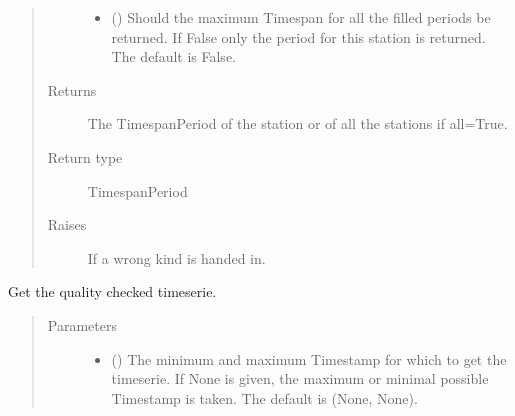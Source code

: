 \documentclass[letterpaper,10pt,english]{sphinxmanual}
\begin{document}
\begin{fulllineitems}
\begin{fulllineitems}
\begin{quote}
\begin{description}
\begin{itemize}
\item {} 
\sphinxAtStartPar
{} (\sphinxstyleliteralemphasis{\sphinxupquote{, }}) \textendash{} Should the maximum Timespan for all the filled periods be returned.
If False only the period for this station is returned.
The default is False.

\end{itemize}

\item[{Returns}] \leavevmode
\sphinxAtStartPar
The TimespanPeriod of the station or of all the stations if all=True.

\item[{Return type}] \leavevmode
\sphinxAtStartPar
TimespanPeriod

\item[{Raises}] \leavevmode
\sphinxAtStartPar
{} \textendash{} If a wrong kind is handed in.

\end{description}\end{quote}

\end{fulllineitems}


\begin{fulllineitems}
\label{\detokenize{weatherDB:weatherDB.station.StationBase.get_qc}}
\sphinxAtStartPar
Get the quality checked timeserie.
\begin{quote}\begin{description}
\item[{Parameters}] \leavevmode\begin{itemize}
\item {} 
\sphinxAtStartPar
{} ({\hyperref[\detokenize{weatherDB.lib:weatherDB.lib.utils.TimestampPeriod}]{}}\sphinxstyleliteralemphasis{\sphinxupquote{(}}\sphinxstyleliteralemphasis{\sphinxupquote{)}}\sphinxstyleliteralemphasis{\sphinxupquote{, }}) \textendash{} The minimum and maximum Timestamp for which to get the timeserie.
If None is given, the maximum or minimal possible Timestamp is taken.
The default is (None, None).


\end{itemize}
\end{description}
\end{quote}
\end{fulllineitems}
\end{fulllineitems}
\end{document}

